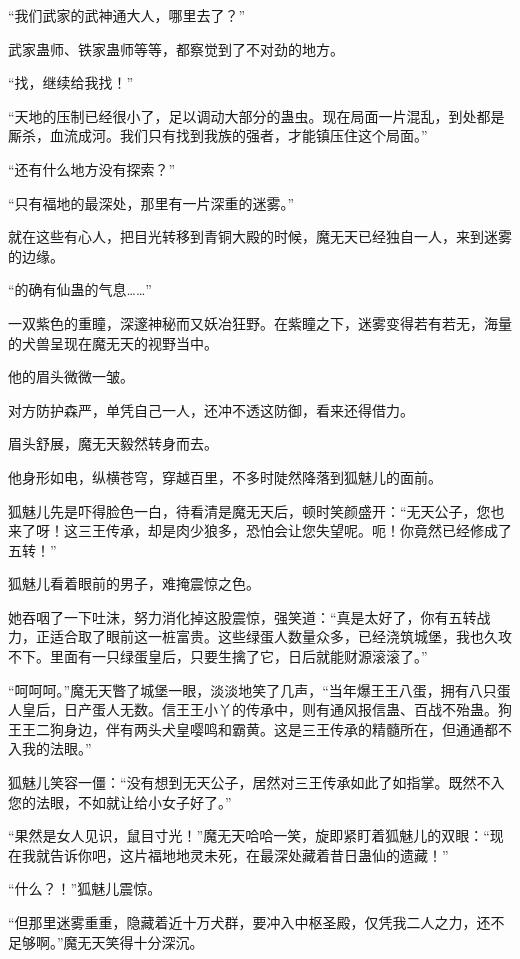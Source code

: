 \begin{this_body}
“我们武家的武神通大人，哪里去了？”

武家蛊师、铁家蛊师等等，都察觉到了不对劲的地方。

“找，继续给我找！”

“天地的压制已经很小了，足以调动大部分的蛊虫。现在局面一片混乱，到处都是厮杀，血流成河。我们只有找到我族的强者，才能镇压住这个局面。”

“还有什么地方没有探索？”

“只有福地的最深处，那里有一片深重的迷雾。”

就在这些有心人，把目光转移到青铜大殿的时候，魔无天已经独自一人，来到迷雾的边缘。

“的确有仙蛊的气息……”

一双紫色的重瞳，深邃神秘而又妖冶狂野。在紫瞳之下，迷雾变得若有若无，海量的犬兽呈现在魔无天的视野当中。

他的眉头微微一皱。

对方防护森严，单凭自己一人，还冲不透这防御，看来还得借力。

眉头舒展，魔无天毅然转身而去。

他身形如电，纵横苍穹，穿越百里，不多时陡然降落到狐魅儿的面前。

狐魅儿先是吓得脸色一白，待看清是魔无天后，顿时笑颜盛开：“无天公子，您也来了呀！这三王传承，却是肉少狼多，恐怕会让您失望呢。呃！你竟然已经修成了五转！”

狐魅儿看着眼前的男子，难掩震惊之色。

她吞咽了一下吐沫，努力消化掉这股震惊，强笑道：“真是太好了，你有五转战力，正适合取了眼前这一桩富贵。这些绿蛋人数量众多，已经浇筑城堡，我也久攻不下。里面有一只绿蛋皇后，只要生擒了它，日后就能财源滚滚了。”

“呵呵呵。”魔无天瞥了城堡一眼，淡淡地笑了几声，“当年爆王王八蛋，拥有八只蛋人皇后，日产蛋人无数。信王王小丫的传承中，则有通风报信蛊、百战不殆蛊。狗王王二狗身边，伴有两头犬皇嘤鸣和霸黄。这是三王传承的精髓所在，但通通都不入我的法眼。”

狐魅儿笑容一僵：“没有想到无天公子，居然对三王传承如此了如指掌。既然不入您的法眼，不如就让给小女子好了。”

“果然是女人见识，鼠目寸光！”魔无天哈哈一笑，旋即紧盯着狐魅儿的双眼：“现在我就告诉你吧，这片福地地灵未死，在最深处藏着昔日蛊仙的遗藏！”

“什么？！”狐魅儿震惊。

“但那里迷雾重重，隐藏着近十万犬群，要冲入中枢圣殿，仅凭我二人之力，还不足够啊。”魔无天笑得十分深沉。


\end{this_body}
